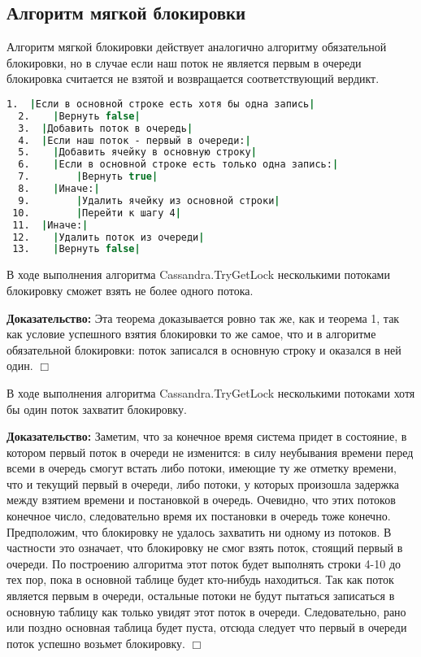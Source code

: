 \subsection{Алгоритм мягкой блокировки}

Алгоритм мягкой блокировки действует аналогично алгоритму обязательной блокировки, но в случае если наш поток не является первым в очереди блокировка считается не взятой и возвращается соответствующий вердикт.

\begin{lstlisting}[language=csh,caption={Алгоритм Cassandra.TryGetLock(lockId, threadId)}]
  1.  |Если в основной строке есть хотя бы одна запись|
  2.  	|Вернуть false|
  3.  |Добавить поток в очередь|
  4.  |Если наш поток - первый в очереди:|
  5.  	|Добавить ячейку в основную строку|
  6.  	|Если в основной строке есть только одна запись:|
  7.  		|Вернуть true|
  8.  	|Иначе:|
  9.  		|Удалить ячейку из основной строки|
 10.  		|Перейти к шагу 4|
 11.  |Иначе:|
 12.  	|Удалить поток из очереди|
 13.  	|Вернуть false|
\end{lstlisting}

\begin{theorem}
В ходе выполнения алгоритма Cassandra.TryGetLock несколькими потоками блокировку сможет взять не более одного потока.
\end{theorem}
\textbf{Доказательство:}
Эта теорема доказывается ровно так же, как и теорема 1, так как условие успешного взятия блокировки то же самое, что и в алгоритме обязательной блокировки: поток записался в основную строку и оказался в ней один.
$\Box$

\begin{theorem}
В ходе выполнения алгоритма Cassandra.TryGetLock несколькими потоками хотя бы один поток захватит блокировку.
\end{theorem}
\textbf{Доказательство:}
Заметим, что за конечное время система придет в состояние, в котором первый поток в очереди не изменится: в силу неубывания времени перед всеми в очередь смогут встать либо потоки, имеющие ту же отметку времени, что и текущий первый в очереди, либо потоки, у которых произошла задержка между взятием времени и постановкой в очередь. Очевидно, что этих потоков конечное число, следовательно время их постановки в очередь тоже конечно.
Предположим, что блокировку не удалось захватить ни одному из потоков. В частности это означает, что блокировку не смог взять поток, стоящий первый в очереди. По построению алгоритма этот поток будет выполнять строки 4-10 до тех пор, пока в основной таблице будет кто-нибудь находиться. Так как поток является первым в очереди, остальные потоки не будут пытаться записаться в основную таблицу как только увидят этот поток в очереди. Следовательно, рано или поздно основная таблица будет пуста, отсюда следует что первый в очереди поток успешно возьмет блокировку.
$\Box$